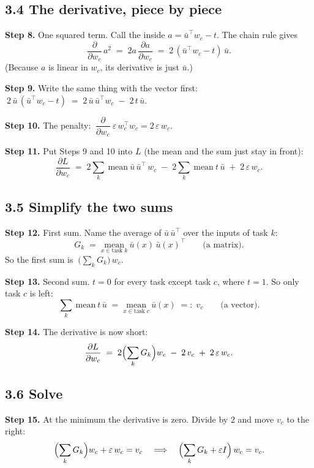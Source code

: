 \documentclass[11pt,a4paper]{article}
\newcommand{\step}[1]{\textbf{Step #1.}}
\newcommand{\ub}{\bar u}
\begin{document}
\subsection*{3.4 The derivative, piece by piece}

\step{8} One squared term. Call the inside $a = \ub^{\top}w_c - t$. The chain rule gives
\[ \frac{\partial}{\partial w_c}\, a^2 \;=\; 2a\,\frac{\partial a}{\partial w_c} \;=\; 2\,(\ub^{\top}w_c - t)\,\ub . \]
(Because $a$ is linear in $w_c$, its derivative is just $\ub$.)

\step{9} Write the same thing with the vector first: $\ 2\,\ub\,(\ub^{\top}w_c - t) \;=\; 2\,\ub\,\ub^{\top} w_c \;-\; 2\,t\,\ub .$

\step{10} The penalty: $\ \dfrac{\partial}{\partial w_c}\ \varepsilon\,w_c^{\top}w_c = 2\,\varepsilon\,w_c .$

\step{11} Put Steps 9 and 10 into $L$ (the mean and the sum just stay in front):
\[ \frac{\partial L}{\partial w_c} \;=\; 2\sum_{k}\ \text{mean}\ \ub\,\ub^{\top}\, w_c \;-\; 2\sum_{k}\ \text{mean}\ t\,\ub \;+\; 2\,\varepsilon\, w_c . \]

\subsection*{3.5 Simplify the two sums}

\step{12} First sum. Name the average of $\ub\,\ub^{\top}$ over the inputs of task $k$:
\[ G_k \;=\; \underset{x \in \text{task } k}{\text{mean}}\ \ub(x)\,\ub(x)^{\top} \qquad \text{(a matrix)}. \]
So the first sum is $\ \bigl(\sum_k G_k\bigr)\, w_c$.

\step{13} Second sum. $t = 0$ for every task except task $c$, where $t=1$. So only task $c$ is left:
\[ \sum_{k}\ \text{mean}\ t\,\ub \;=\; \underset{x \in \text{task } c}{\text{mean}}\ \ub(x) \;=:\; v_c \qquad \text{(a vector)}. \]

\step{14} The derivative is now short:
\[ \frac{\partial L}{\partial w_c} \;=\; 2\Bigl(\sum_k G_k\Bigr) w_c \;-\; 2\,v_c \;+\; 2\,\varepsilon\,w_c . \]

\subsection*{3.6 Solve}

\step{15} At the minimum the derivative is zero. Divide by 2 and move $v_c$ to the right:
\[ \Bigl(\sum_k G_k\Bigr) w_c + \varepsilon\,w_c = v_c
   \quad\Longrightarrow\quad \Bigl(\sum_k G_k + \varepsilon I\Bigr)\, w_c = v_c . \]
\end{document}
